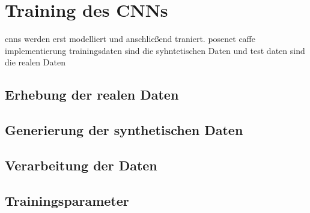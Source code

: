 
\section{Training des CNNs}
cnns werden erst modelliert und anschließend traniert.
posenet caffe implementierung
trainingsdaten sind die syhntetischen Daten und test daten sind die realen Daten

\subsection{Erhebung der realen Daten}
\subsection{Generierung der synthetischen Daten}
\subsection{Verarbeitung der Daten}
\subsection{Trainingsparameter}